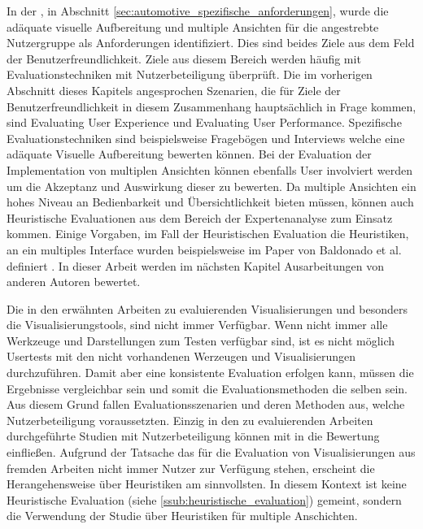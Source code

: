 \documentclass[draft=false
              ,paper=a4
              ,twoside=false
              ,fontsize=11pt
              ,headsepline
              ,BCOR10mm
              ,DIV11
              ]{scrbook}
\begin{document}
In der , in Abschnitt \ref{sec:automotive_spezifische_anforderungen}, wurde die adäquate visuelle Aufbereitung und multiple Ansichten für die angestrebte Nutzergruppe als Anforderungen identifiziert. Dies sind beides Ziele aus dem Feld der Benutzerfreundlichkeit. Ziele aus diesem Bereich werden häufig mit Evaluationstechniken mit Nutzerbeteiligung überprüft. Die im vorherigen Abschnitt dieses Kapitels angesprochen Szenarien, die für Ziele der Benutzerfreundlichkeit in diesem Zusammenhang hauptsächlich in Frage kommen, sind Evaluating User Experience und Evaluating User Performance. Spezifische Evaluationstechniken sind beispielsweise Fragebögen und Interviews welche eine adäquate Visuelle Aufbereitung bewerten können. Bei der Evaluation der Implementation von multiplen Ansichten können ebenfalls User involviert werden um die Akzeptanz und Auswirkung dieser zu bewerten. Da multiple Ansichten ein hohes Niveau an Bedienbarkeit und Übersichtlichkeit bieten müssen, können auch Heuristische Evaluationen aus dem Bereich der Expertenanalyse zum Einsatz kommen. Einige Vorgaben, im Fall der Heuristischen Evaluation die Heuristiken, an ein multiples Interface wurden beispielsweise im Paper von Baldonado et al. definiert \cite{wang_baldonado_guidelines_2000}. In dieser Arbeit werden im nächsten Kapitel Ausarbeitungen von anderen Autoren bewertet.

Die in den erwähnten Arbeiten zu evaluierenden Visualisierungen und besonders die Visualisierungstools, sind nicht immer Verfügbar. Wenn nicht immer alle Werkzeuge und Darstellungen zum Testen verfügbar sind, ist es nicht möglich Usertests mit den nicht vorhandenen Werzeugen und Visualisierungen durchzuführen. Damit aber eine konsistente Evaluation erfolgen kann, müssen die Ergebnisse vergleichbar sein und somit die Evaluationsmethoden die selben sein. Aus diesem Grund fallen Evaluationsszenarien und deren Methoden aus, welche Nutzerbeteiligung voraussetzten. Einzig in den zu evaluierenden Arbeiten durchgeführte Studien mit Nutzerbeteiligung können mit in die Bewertung einfließen. Aufgrund der Tatsache das für die Evaluation von Visualisierungen aus fremden Arbeiten nicht immer Nutzer zur Verfügung stehen, erscheint die Herangehensweise über Heuristiken am sinnvollsten. In diesem Kontext ist keine Heuristische Evaluation (siehe \ref{ssub:heuristische_evaluation}) gemeint, sondern die Verwendung der Studie über Heuristiken für multiple Anschichten.
\end{document}
